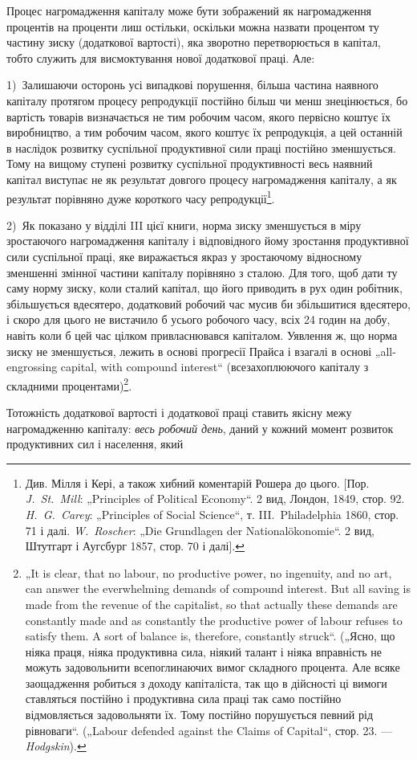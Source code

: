 Процес нагромадження капіталу може бути зображений як
нагромадження процентів на проценти лиш остільки, оскільки
можна назвати процентом ту частину зиску (додаткової вартості),
яка зворотно перетворюється в капітал, тобто служить для висмоктування
нової додаткової праці. Але:

1)~Залишаючи осторонь усі випадкові порушення, більша частина
наявного капіталу протягом процесу репродукції постійно
більш чи менш знецінюється, бо вартість товарів визначається
не тим робочим часом, якого первісно коштує їх виробництво,
а тим робочим часом, якого коштує їх репродукція, а цей останній
в наслідок розвитку суспільної продуктивної сили праці постійно
зменшується. Тому на вищому ступені розвитку суспільної
продуктивності весь наявний капітал виступає не як результат
довгого процесу нагромадження капіталу, а як результат
порівняно дуже короткого часу репродукції\footnote{
Див. Мілля і Кері, а також хибний коментарій Рошера до цього. [Пор.
\emph{J.~St.~Mill}: „Principles of Political Economy“. 2 вид, Лондон, 1849, стор. 92. \emph{H.~G.~Carey}: „Principles of Social Science“, т. III.~Philadelphia 1860, стор. 71 і далі.
\emph{W.~Roscher}: „Die Grundlagen der Nationalökonomie“. 2 вид, Штутгарт і Аугсбург
1857, стор. 70 і далі].
}.

2)~Як показано у відділі III цієї книги, норма зиску зменшується
в міру зростаючого нагромадження капіталу і відповідного
йому зростання продуктивної сили суспільної праці, яке
виражається якраз у зростаючому відносному зменшенні змінної
частини капіталу порівняно з сталою. Для того, щоб дати ту
саму норму зиску, коли сталий капітал, що його приводить в рух
один робітник, збільшується вдесятеро, додатковий робочий час
мусив би збільшитися вдесятеро, і скоро для цього не вистачило
б усього робочого часу, всіх 24 годин на добу, навіть
коли б цей час цілком привласнювався капіталом. Уявлення ж, що
норма зиску не зменшується, лежить в основі прогресії Прайса
і взагалі в основі „all-engrossing capital, with compound interest“
(всезахоплюючого капіталу з складними процентами)\footnote{
„It is clear, that no labour, no productive power, no ingenuity, and no art,
can answer the everwhelming demands of compound interest. But all saving is
made from the revenue of the capitalist, so that actually these demands are constantly
made and as constantly the productive power of labour refuses to satisfy
them. A sort of balance is, therefore, constantly struck“. („Ясно, що ніяка праця,
ніяка продуктивна сила, ніякий талант і ніяка вправність не можуть задовольнити
всепоглинаючих вимог складного процента. Але всяке заощадження робиться з
доходу капіталіста, так що в дійсності ці вимоги ставляться постійно і продуктивна сила праці так
само постійно відмовляється задовольняти їх. Тому
постійно порушується певний рід рівноваги“. („Labour defended against the Claims
of Capital“, стор. 23. — \emph{Hodgskin}).
}.

Тотожність додаткової вартості і додаткової праці ставить
якісну межу нагромадженню капіталу: \emph{весь робочий день}, даний
у кожний момент розвиток продуктивних сил і населення, який
\parbreak{}  %
